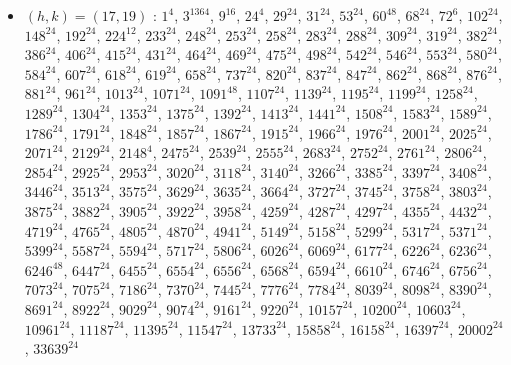 \begin{itemize}
\item $(h,k)=(17,19)$ : $1^{4}$, $3^{1364}$, $9^{16}$, $24^{4}$, $29^{24}$, $31^{24}$, $53^{24}$, $60^{48}$, $68^{24}$, $72^{6}$, $102^{24}$, $148^{24}$, $192^{24}$, $224^{12}$, $233^{24}$, $248^{24}$, $253^{24}$, $258^{24}$, $283^{24}$, $288^{24}$, $309^{24}$, $319^{24}$, $382^{24}$, $386^{24}$, $406^{24}$, $415^{24}$, $431^{24}$, $464^{24}$, $469^{24}$, $475^{24}$, $498^{24}$, $542^{24}$, $546^{24}$, $553^{24}$, $580^{24}$, $584^{24}$, $607^{24}$, $618^{24}$, $619^{24}$, $658^{24}$, $737^{24}$, $820^{24}$, $837^{24}$, $847^{24}$, $862^{24}$, $868^{24}$, $876^{24}$, $881^{24}$, $961^{24}$, $1013^{24}$, $1071^{24}$, $1091^{48}$, $1107^{24}$, $1139^{24}$, $1195^{24}$, $1199^{24}$, $1258^{24}$, $1289^{24}$, $1304^{24}$, $1353^{24}$, $1375^{24}$, $1392^{24}$, $1413^{24}$, $1441^{24}$, $1508^{24}$, $1583^{24}$, $1589^{24}$, $1786^{24}$, $1791^{24}$, $1848^{24}$, $1857^{24}$, $1867^{24}$, $1915^{24}$, $1966^{24}$, $1976^{24}$, $2001^{24}$, $2025^{24}$, $2071^{24}$, $2129^{24}$, $2148^{4}$, $2475^{24}$, $2539^{24}$, $2555^{24}$, $2683^{24}$, $2752^{24}$, $2761^{24}$, $2806^{24}$, $2854^{24}$, $2925^{24}$, $2953^{24}$, $3020^{24}$, $3118^{24}$, $3140^{24}$, $3266^{24}$, $3385^{24}$, $3397^{24}$, $3408^{24}$, $3446^{24}$, $3513^{24}$, $3575^{24}$, $3629^{24}$, $3635^{24}$, $3664^{24}$, $3727^{24}$, $3745^{24}$, $3758^{24}$, $3803^{24}$, $3875^{24}$, $3882^{24}$, $3905^{24}$, $3922^{24}$, $3958^{24}$, $4259^{24}$, $4287^{24}$, $4297^{24}$, $4355^{24}$, $4432^{24}$, $4719^{24}$, $4765^{24}$, $4805^{24}$, $4870^{24}$, $4941^{24}$, $5149^{24}$, $5158^{24}$, $5299^{24}$, $5317^{24}$, $5371^{24}$, $5399^{24}$, $5587^{24}$, $5594^{24}$, $5717^{24}$, $5806^{24}$, $6026^{24}$, $6069^{24}$, $6177^{24}$, $6226^{24}$, $6236^{24}$, $6246^{48}$, $6447^{24}$, $6455^{24}$, $6554^{24}$, $6556^{24}$, $6568^{24}$, $6594^{24}$, $6610^{24}$, $6746^{24}$, $6756^{24}$, $7073^{24}$, $7075^{24}$, $7186^{24}$, $7370^{24}$, $7445^{24}$, $7776^{24}$, $7784^{24}$, $8039^{24}$, $8098^{24}$, $8390^{24}$, $8691^{24}$, $8922^{24}$, $9029^{24}$, $9074^{24}$, $9161^{24}$, $9220^{24}$, $10157^{24}$, $10200^{24}$, $10603^{24}$, $10961^{24}$, $11187^{24}$, $11395^{24}$, $11547^{24}$, $13733^{24}$, $15858^{24}$, $16158^{24}$, $16397^{24}$, $20002^{24}$, $33639^{24}$

\end{itemize}
